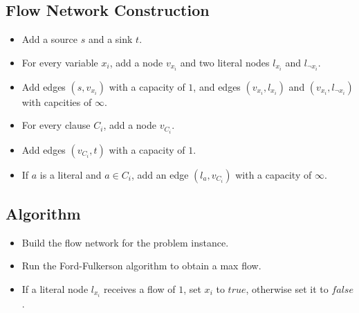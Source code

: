 \documentclass[12pt]{article}
\begin{document}
\subsection*{Flow Network Construction}
\begin{itemize}
	\item Add a source $s$ and a sink $t$.
	\item For every variable $x_i$, add a node $v_{x_i}$ and two literal nodes $l_{x_i}$ and $l_{\neg x_i}$.
	\item Add edges $(s, v_{x_i})$ with a capacity of $1$, and edges $(v_{x_i}, l_{x_i})$ and $(v_{x_i}, l_{\neg x_i})$ with capcities of $\infty$.
	\item For every clause $C_i$, add a node $v_{C_i}$.
	\item Add edges $(v_{C_i}, t)$ with a capacity of $1$.
	\item If $a$ is a literal and $a \in C_i$, add an edge $(l_a, v_{C_i})$ with a capacity of $\infty$.
\end{itemize}

\subsection*{Algorithm}
\begin{itemize}
	\item Build the flow network for the problem instance.
	\item Run the Ford-Fulkerson algorithm to obtain a max flow.
	\item If a literal node $l_{x_i}$ receives a flow of $1$, set $x_i$ to $\mathit{true}$, otherwise set it to $\mathit{false}$.
\end{itemize}
\end{document}

